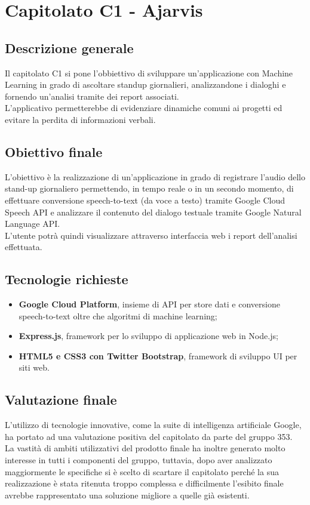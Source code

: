\documentclass[StudioDiFattibilità.tex]{subfiles}
\begin{document}
	\chapter{Capitolato C1 - Ajarvis}
	\section{Descrizione generale}
	Il capitolato C1 si pone l'obbiettivo di sviluppare un'applicazione con Machine Learning in grado di ascoltare standup giornalieri, analizzandone i dialoghi e fornendo un'analisi tramite dei report associati.\\
	L'applicativo permetterebbe di evidenziare dinamiche comuni ai progetti ed evitare la perdita di informazioni verbali.
	
	\section{Obiettivo finale}
	L'obiettivo è la realizzazione di un'applicazione in grado di registrare l'audio dello stand-up giornaliero permettendo, in tempo reale o in un secondo momento, di effettuare conversione speech-to-text (da voce a testo) tramite Google Cloud Speech API e analizzare il contenuto del dialogo testuale tramite Google Natural Language API.\\
	L'utente potrà quindi visualizzare attraverso interfaccia web i report dell'analisi effettuata. 
	
	\section{Tecnologie richieste}
	\begin{itemize}
		\item \textbf{Google Cloud Platform}, insieme di API per store dati e conversione speech-to-text oltre che algoritmi di machine learning;
		\item \textbf{Express.js}, framework per lo sviluppo di applicazione web in Node.js;
		\item \textbf{HTML5 e CSS3 con Twitter Bootstrap}, framework di sviluppo UI per siti web.
	\end{itemize}
	
	\section{Valutazione finale}
	L'utilizzo di tecnologie innovative, come la suite di intelligenza artificiale Google, ha portato ad una valutazione positiva del capitolato da parte del gruppo 353.\\
	La vastità di ambiti utilizzativi del prodotto finale ha inoltre generato molto interesse in tutti i componenti del gruppo, tuttavia, dopo aver analizzato maggiormente le specifiche si è scelto di scartare il capitolato perché la sua realizzazione è stata ritenuta troppo complessa e difficilmente l'esibito finale avrebbe rappresentato una soluzione migliore a quelle già esistenti.
	
\end{document}
